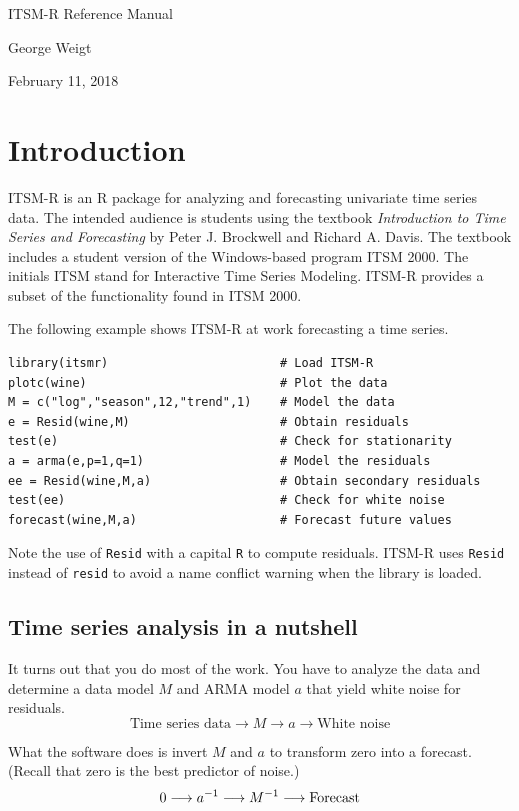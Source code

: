 \documentclass[12pt]{article}
\begin{document}
\begin{center}
{\LARGE ITSM-R Reference Manual}

George Weigt

February 11, 2018
\end{center}

\tableofcontents

\section{Introduction}
ITSM-R is an R package for analyzing and forecasting univariate
time series data.
The intended audience is students using the textbook
{\it Introduction to Time Series and Forecasting}
by Peter J. Brockwell and Richard A. Davis.
The textbook includes a student version of the Windows-based program ITSM 2000.
The initials ITSM stand for Interactive Time Series Modeling.
ITSM-R provides a subset of the functionality found in ITSM 2000.

\bigskip
The following example shows ITSM-R at work forecasting a time series.

\begin{verbatim}
library(itsmr)                        # Load ITSM-R
plotc(wine)                           # Plot the data
M = c("log","season",12,"trend",1)    # Model the data
e = Resid(wine,M)                     # Obtain residuals
test(e)                               # Check for stationarity
a = arma(e,p=1,q=1)                   # Model the residuals
ee = Resid(wine,M,a)                  # Obtain secondary residuals
test(ee)                              # Check for white noise
forecast(wine,M,a)                    # Forecast future values
\end{verbatim}

Note the use of {\tt Resid} with a capital {\tt R} to compute residuals.
ITSM-R uses {\tt Resid} instead of {\tt resid} to avoid a name conflict
warning when the library is loaded.

\subsection{Time series analysis in a nutshell}
It turns out that you do most of the work.
You have to analyze the data and
determine a data model $M$ and ARMA model $a$
that yield white noise for residuals.
\[
\text{Time series data}
\longrightarrow M\longrightarrow a\longrightarrow
\text{White noise}
\]

What the software does is invert $M$ and $a$ to transform zero into a forecast.
(Recall that zero is the best predictor of noise.)
\[
0\longrightarrow a^{-1}\longrightarrow M^{-1}\longrightarrow{\rm Forecast}
\]
\end{document}
